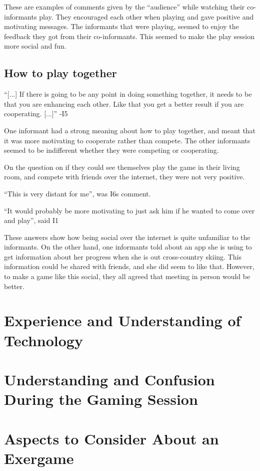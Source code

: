 These are examples of comments given by the “audience” while watching their co-informants play. They encouraged each other when playing and gave positive and motivating messages. The informants that were playing, seemed to enjoy the feedback they got from their co-informants. This seemed to make the play session more social and fun.  

\subsection{How to play together}
“[...] If there is going to be any point in doing something together, it needs to be that you are enhancing each other. Like that you get a better result if you are cooperating. [...]” -I5

One informant had a strong meaning about how to play together, and meant that it was more motivating to cooperate rather than compete. The other informants seemed to be indifferent whether they were competing or cooperating.

On the question on if they could see themselves play the game in their living room, and compete with friends over the internet, they were not very positive.

“This is very distant for me”, was I6s comment.

“It would probably be more motivating to just ask him if he wanted to come over and play”, said I1

These answers show how being social over the internet is quite unfamiliar to the informants. On the other hand, one informants told about an app she is using to get information about her progress when she is out cross-country skiing. This information could be shared with friends, and she did seem to like that. However, to make a game like this social, they all agreed that meeting in person would be better.

\section{Experience and Understanding of Technology}

\section{Understanding and Confusion During the Gaming Session}

\section{Aspects to Consider About an Exergame}
